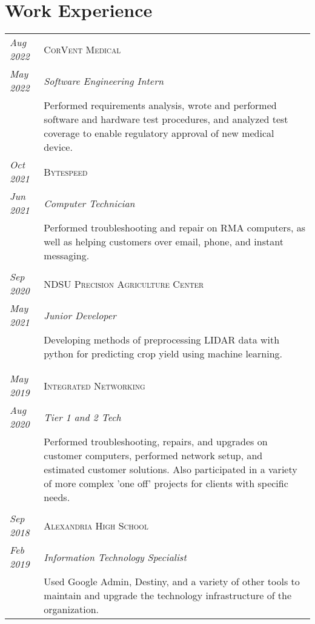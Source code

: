 \documentclass[letterpaper,10pt]{article}
\begin{document}
\section*{Work Experience}
	\begin{tabular}{R{2cm}|p{14cm}}
	\textsl{Aug 2022}	&\textsc{CorVent Medical}\\
	\textsl{May 2022}	&\emph{Software Engineering Intern}\\
	& Performed requirements analysis, wrote and performed software and hardware test procedures, and analyzed test coverage to enable regulatory approval of new medical device.\\
	\textsl{Oct 2021}	& \textsc{Bytespeed}\\
	\textsl{Jun 2021}	& \emph{Computer Technician}\\
	& Performed troubleshooting and repair on RMA computers, as well as helping customers over email, phone, and instant messaging.\\
	\\
	\textsl{Sep 2020}	& \textsc{NDSU Precision Agriculture Center}\\
	\textsl{May 2021}	& \emph{Junior Developer}\\
	& Developing methods of preprocessing LIDAR data with python for predicting crop yield using machine learning.\\
	\\
	\\
	\textsl{May 2019}	& \textsc{Integrated Networking}\\
	\textsl{Aug 2020}	& \emph{Tier 1 and 2 Tech}\\
	& Performed troubleshooting, repairs, and upgrades on customer computers, performed network setup, and estimated customer solutions.
	Also participated in a variety of more complex 'one off' projects for clients with specific needs.\\
	\\
	\textsl{Sep 2018}	& \textsc{Alexandria High School}\\
	\textsl{Feb 2019}	& \emph{Information Technology Specialist}\\
	& Used Google Admin, Destiny, and a variety of other tools to maintain and upgrade the technology infrastructure of the organization.\\
	\end{tabular}
\end{document}
